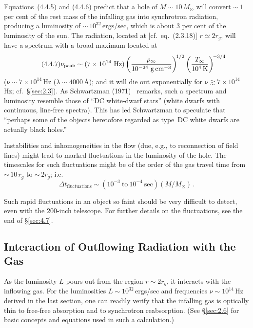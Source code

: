 Equations~(4.4.5) and (4.4.6) predict that a hole of $M \sim 10\,M_\odot$ will convert
${\sim}\,1$ per cent of the rest mass of the infalling gas into synchrotron radiation,
producing a luminosity of ${\sim}\,10^{32}$\,ergs/sec, which is about 3 per cent of the
luminosity of the sun.  The radiation, located at [cf.\ eq.~(2.3.18)] $r \simeq 2r_g$, will have a spectrum
with a broad maximum located at
%
\begin{equation}
\tag{4.4.7}
\nu_{\mathrm{peak}}
\sim (7 \times 10^{14}~\text{Hz})
  \left(\frac{\rho_\infty}{10^{-24}~\text{g\,cm}^{-3}}\right)^{\!1/2}
  \left(\frac{T_\infty}{10^4\,\text{K}}\right)^{\!-3/4}
\end{equation}
%
($\nu \sim 7 \times 10^{14}$\,Hz ($\lambda \sim 4000$\,\AA); and it will die out exponentially for
$\nu \gtrsim 7 \times 10^{14}$\,Hz; cf.\ \S\ref{sec:2.3}).  As Schwartzman (1971)~\cite{Schwartzman1971} remarks, such a spectrum
and luminosity resemble those of ``DC white-dwarf stars'' (white dwarfs with
continuous, line-free spectra).  This has led Schwartzman to speculate that
``perhaps some of the objects heretofore regarded as type~DC white dwarfs are
actually black holes.''

Instabilities and inhomogeneities in the flow (due, e.g., to reconnection of
field lines) might lead to marked fluctuations in the luminosity of the hole.  The
timescales for such fluctuations might be of the order of the gas travel time from
${\sim}\,10\,r_g$ to ${\sim}\,2r_g$; i.e.
%
\begin{equation}
\tag{4.4.8}
\Delta t_{\mathrm{fluctuations}}
\sim (10^{-3}~\text{to}~10^{-4}~\text{sec})(M/M_\odot)\,.
\end{equation}

Such rapid fluctuations in an object so faint should be very difficult to detect,
even with the 200-inch telescope.  For further details on the fluctuations, see
the end of \S\ref{sec:4.7}.


\subsection{Interaction of Outflowing Radiation with the Gas}
\label{sec:4.5}

As the luminosity $L$ pours out from the region $r \sim 2r_g$, it interacts with the
inflowing gas.  For the luminosities $L \sim 10^{32}$\,ergs/sec and frequencies $\nu \sim 10^{14}$\,Hz
derived in the last section, one can readily verify that the infalling gas is optically
thin to free-free absorption and to synchrotron reabsorption.  (See \S\ref{sec:2.6} for
basic concepts and equations used in such a calculation.)

